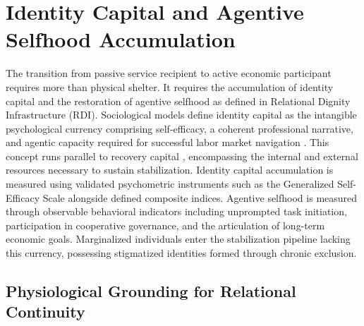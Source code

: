 \documentclass[12pt, letterpaper]{article}
\begin{document}
\section{Identity Capital and Agentive Selfhood Accumulation}

The transition from passive service recipient to active economic participant requires more than physical shelter. It requires the accumulation of identity capital and the restoration of agentive selfhood as defined in Relational Dignity Infrastructure (RDI). Sociological models define identity capital as the intangible psychological currency comprising self-efficacy, a coherent professional narrative, and agentic capacity required for successful labor market navigation \citep{cote2002identity}. This concept runs parallel to recovery capital \citep{white2008recovery}, encompassing the internal and external resources necessary to sustain stabilization. Identity capital accumulation is measured using validated psychometric instruments such as the Generalized Self-Efficacy Scale \citep{schwarzer1995generalized} alongside defined composite indices. Agentive selfhood is measured through observable behavioral indicators including unprompted task initiation, participation in cooperative governance, and the articulation of long-term economic goals. Marginalized individuals enter the stabilization pipeline lacking this currency, possessing stigmatized identities formed through chronic exclusion.

\subsection{Physiological Grounding for Relational Continuity}
\end{document}
